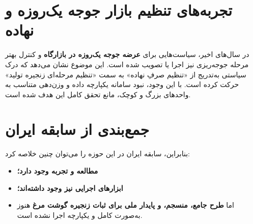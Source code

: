 \documentclass[12pt,a4paper]{report}
\begin{document}
\section{تجربه‌های تنظیم بازار جوجه یک‌روزه و نهاده}
در سال‌های اخیر، سیاست‌هایی برای \textbf{عرضه جوجه یک‌روزه در بازارگاه} و کنترل بهتر مرحله جوجه‌ریزی نیز اجرا یا تصویب شده است. این موضوع نشان می‌دهد که درک سیاستی به‌تدریج از «تنظیم صرفِ نهاده» به سمت «تنظیم مرحله‌ای زنجیره تولید» حرکت کرده است. با این وجود، نبود سامانه یکپارچه داده و وزن‌دهی متناسب به واحدهای بزرگ و کوچک، مانع تحقق کامل این هدف شده است.

\section{جمع‌بندی از سابقه ایران}
بنابراین، سابقه ایران در این حوزه را می‌توان چنین خلاصه کرد:
\begin{itemize}
    \item \textbf{مطالعه و تجربه وجود دارد؛}
    \item \textbf{ابزارهای اجرایی نیز وجود داشته‌اند؛}
    \item اما \textbf{طرح جامع، منسجم، و پایدار ملی برای ثبات زنجیره گوشت مرغ} هنوز به‌صورت کامل و یکپارچه اجرا نشده است.
\end{itemize}
\end{document}
